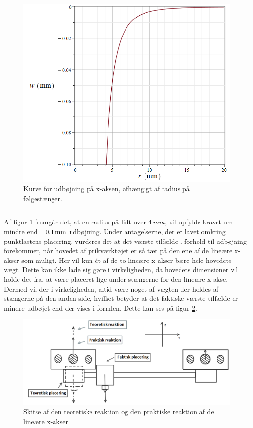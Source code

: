 \begin{figure}[H]
    \centering
    \includegraphics[width=0.5\linewidth]{Sections/6 Detaljeløsning/Media/Udbøjning ifht. r.png}
    \caption{Kurve for udbøjning på x-aksen, afhængigt af radius på følgestænger.}
    \label{fig: Udbøjninggraf}
\end{figure} \plainbreak{-0.5}

Af figur \ref{fig: Udbøjninggraf} fremgår det, at en radius på lidt over $\SI{4}{mm}$, vil opfylde kravet om mindre end $\SI{\pm 0,1}{mm}$ udbøjning. Under antagelserne, der er lavet omkring punktlastens placering, vurderes det at det værste tilfælde i forhold til udbøjning forekommer, når hovedet af prikværktøjet er så tæt på den ene af de lineære x-akser som muligt. Her vil kun ét af de to lineære x-akser bære hele hovedets vægt. Dette kan ikke lade sig gøre i virkeligheden, da hovedets dimensioner vil holde det fra, at være placeret lige under stængerne for den lineære x-akse. Dermed vil der i virkeligheden, altid være noget af vægten der holdes af stængerne på den anden side, hvilket betyder at det faktiske værste tilfælde er mindre udbøjet end der vises i formlen. Dette kan ses på figur \ref{fig: Udbøjningpraktik}.

\begin{figure}[H]
    \centering
    \includegraphics[width=0.8\linewidth]{Sections/6 Detaljeløsning/Media/Praktisk vs teoretisk udbøjning.png}
    \caption{Skitse af den teoretiske reaktion og den praktiske reaktion af de lineære x-akser}
    \label{fig: Udbøjningpraktik}
\end{figure}

